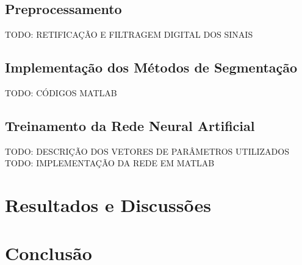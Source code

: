 \documentclass[
	12pt,				%
	openright,			%
	oneside,
	a4paper,			%
	english,			%
	francais,			%
	spanish,			%
	brazil				%
	]{abntex2}
\begin{document}
\section{Preprocessamento}

	TODO: RETIFICAÇÃO E FILTRAGEM DIGITAL DOS SINAIS

\section{Implementação dos Métodos de Segmentação}

	TODO: CÓDIGOS MATLAB

\section{Treinamento da Rede Neural Artificial}

	TODO: DESCRIÇÃO DOS VETORES DE PARÂMETROS UTILIZADOS
	TODO: IMPLEMENTAÇÃO DA REDE EM MATLAB

\chapter{Resultados e Discussões}



\chapter{Conclusão}

\postextual


\end{document}
